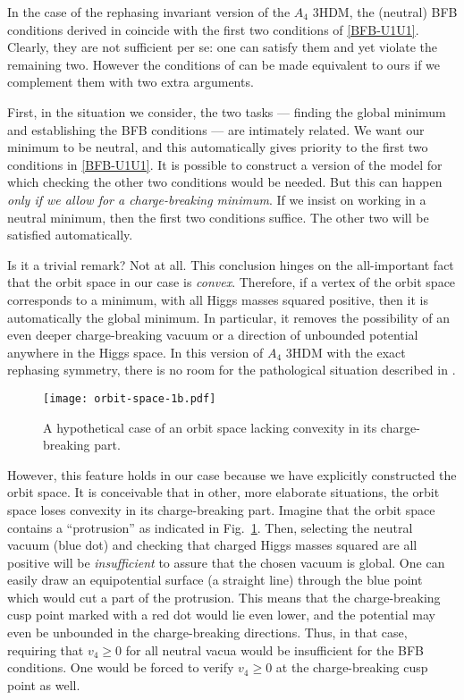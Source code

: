 \documentclass[11pt]{article}
\begin{document}
In the case of the rephasing invariant version of the $A_4$ 3HDM, 
the (neutral) BFB conditions derived in \cite{Dekens:2011,Pramanick:2017wry} coincide
with the first two conditions of \eqref{BFB-U1U1}.
Clearly, they are not sufficient per se: one can satisfy them and yet violate the remaining two.
However the conditions of \cite{Dekens:2011,Pramanick:2017wry} can be made equivalent to ours
if we complement them with two extra arguments.

First, in the situation we consider, the two tasks --- finding the global minimum and establishing the BFB conditions ---
are intimately related. 
We want our minimum to be neutral, and this automatically gives priority to the first two conditions in \eqref{BFB-U1U1}.
It is possible to construct a version of the model for which checking the other two conditions would be needed.
But this can happen {\em only if we allow for a charge-breaking minimum}.
If we insist on working in a neutral minimum, then the first two conditions suffice.
The other two will be satisfied automatically.

Is it a trivial remark? Not at all. This conclusion hinges on the all-important fact
that the orbit space in our case is {\em convex}. Therefore, if a vertex of the orbit space corresponds to a minimum,
with all Higgs masses squared positive, then it is automatically the global minimum.
In particular, it removes the possibility of an even deeper charge-breaking vacuum or a direction of unbounded potential anywhere in the Higgs space.
In this version of $A_4$ 3HDM with the exact rephasing symmetry, 
there is no room for the pathological situation described in \cite{Faro:2019vcd}.

\begin{figure} [ht]
	\begin{center}
		\texttt{[image: orbit-space-1b.pdf]}
		\caption{A hypothetical case of an orbit space lacking convexity
			in its charge-breaking part. }
		\label{fig-rho-z-2}
	\end{center}
\end{figure}

However, this feature holds in our case because we have explicitly constructed the orbit space.
It is conceivable that in other, more elaborate situations, the orbit space loses 
convexity in its charge-breaking part.
Imagine that the orbit space contains a ``protrusion'' as indicated in Fig.~\ref{fig-rho-z-2}.
Then, selecting the neutral vacuum (blue dot) and checking that charged Higgs masses squared are all positive
will be {\em insufficient} to assure that the chosen vacuum is global.
One can easily draw an equipotential surface (a straight line) through the blue point 
which would cut a part of the protrusion. This means that the charge-breaking cusp point 
marked with a red dot would lie even lower, and the potential may even be unbounded in the charge-breaking directions.
Thus, in that case, requiring that $v_4 \ge 0$ for all neutral vacua would be insufficient for the BFB conditions.
One would be forced to verify $v_4 \ge 0$ at the charge-breaking cusp point as well.
\end{document}
